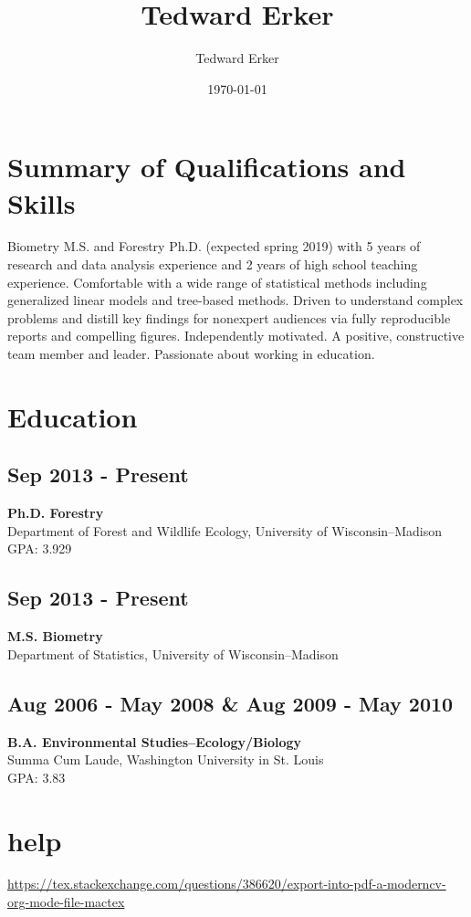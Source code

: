 \documentclass{moderncv}
\author{Tedward Erker}
\date{\today}
\title{Tedward Erker}
\begin{document}
\maketitle
\section*{Summary of Qualifications and Skills}
\label{sec:orga7ee466}
Biometry M.S. and Forestry Ph.D. (expected spring 2019) with 5 years
of research and data analysis experience and 2 years of high school
teaching experience.  Comfortable with a wide range of statistical
methods including generalized linear models and tree-based
methods. Driven to understand complex problems and distill key
findings for nonexpert audiences via fully reproducible reports and
compelling figures.  Independently motivated. A positive, constructive
team member and leader.  Passionate about working in education.
\section*{Education}
\label{sec:org88f96a2}
\subsection*{Sep 2013 - Present}
\label{sec:org32a2056}
\textbf{Ph.D. Forestry} \\
Department of Forest and Wildlife Ecology, University of Wisconsin--Madison \\
GPA: 3.929

\subsection*{Sep 2013 - Present}
\label{sec:orgebadf06}
\textbf{M.S. Biometry} \\
Department of Statistics, University of Wisconsin--Madison

\subsection*{Aug 2006 - May 2008 \& Aug 2009 - May 2010}
\label{sec:orgd9aac81}
\textbf{B.A. Environmental Studies--Ecology/Biology} \\
Summa Cum Laude, Washington University in St. Louis \\
GPA: 3.83

\section*{help}
\label{sec:org6404a9d}
\url{https://tex.stackexchange.com/questions/386620/export-into-pdf-a-moderncv-org-mode-file-mactex}
\end{document}
